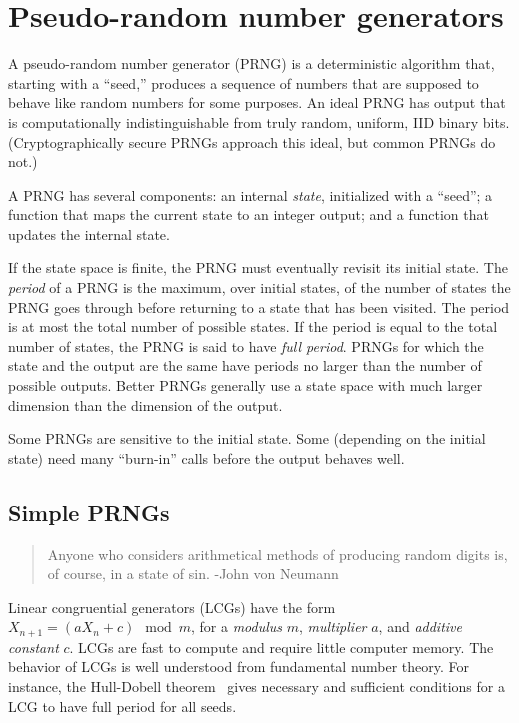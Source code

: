\documentclass[graybox]{svmult}
\begin{document}
\section{Pseudo-random number generators}
\label{sec:prngs}

A pseudo-random number generator (PRNG) is a deterministic algorithm that, starting with
a ``seed,'' produces a sequence of numbers that are supposed to behave like random numbers
for some purposes.
An ideal PRNG has output that is computationally indistinguishable from truly random, uniform, IID 
binary bits. 
(Cryptographically secure PRNGs approach this ideal, but common PRNGs do not.)

A PRNG has several components:
an internal \emph{state}, initialized with a ``seed'';
a function that maps the current state to an integer output;
and a function that updates the internal state.

If the state space is finite, the PRNG must eventually revisit its initial state.
The \emph{period} of a PRNG is the maximum, over initial states, of the number of states 
the PRNG goes through before returning to a state that has been visited.
The period is at most the total number of possible states.
If the period is equal to the total number of states, the PRNG is said to have \emph{full period}.
PRNGs for which the state and the output are the same have periods no larger than the number of possible outputs.
Better PRNGs generally use a state space with much larger dimension than the dimension of the output.

Some PRNGs are sensitive to the initial state.
Some (depending on the initial state) need many ``burn-in'' calls before the output 
behaves well.

\subsection{Simple PRNGs}

\begin{quotation}
Anyone who considers arithmetical methods of producing random digits is, of course, in a state of sin.  -John von Neumann
\end{quotation}


Linear congruential generators (LCGs) have the form $X_{n+1} = (a X_n + c) \mod m$, for a 
\emph{modulus} $m$, 
\emph{multiplier} $a$, and \emph{additive constant} $c$.
LCGs are fast to compute and require little computer memory.
The behavior of LCGs is well understood from fundamental number theory.
For instance, the Hull-Dobell theorem~\cite{fix_me} 
gives necessary and sufficient conditions for a LCG to have full period for all seeds.
\end{document}
